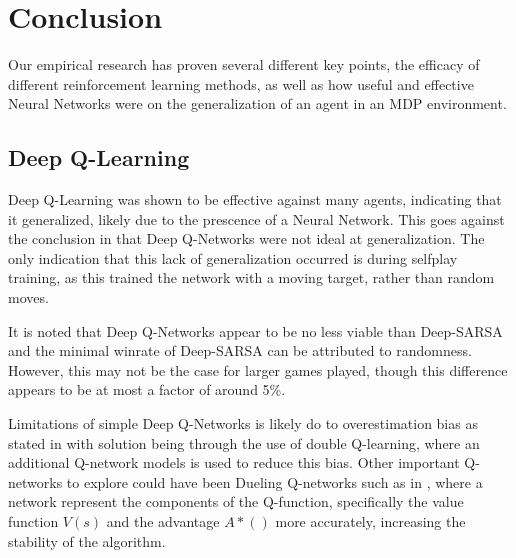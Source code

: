 \section{Conclusion}
Our empirical research has proven several different key points, the efficacy of different reinforcement learning methods, as well as how useful and effective Neural Networks were on the generalization of an agent in an MDP environment.
\subsection{Deep Q-Learning}
Deep Q-Learning was shown to be effective against many agents, indicating that it generalized, likely due to the prescence of a Neural Network. This goes against the conclusion in \citet{ree13} that Deep Q-Networks were not ideal at generalization. The only indication that this lack of generalization occurred is during selfplay training, as this trained the network with a moving target, rather than random moves.

It is noted that Deep Q-Networks appear to be no less viable than Deep-SARSA and the minimal winrate of Deep-SARSA can be attributed to randomness. However, this may not be the case for larger games played, though this difference appears to be at most a factor of around 5\%.

Limitations of simple Deep Q-Networks is likely do to overestimation bias as stated in \citet{8939117} with solution being through the use of double Q-learning, where an additional Q-network models is used to reduce this bias. Other important Q-networks to explore could have been Dueling Q-networks such as in \citet{DBLP:journals/corr/abs-2106-14642}, where a network represent the components of the Q-function, specifically the value function $V(s)$ and the advantage $A*()$ more accurately, increasing the stability of the algorithm.